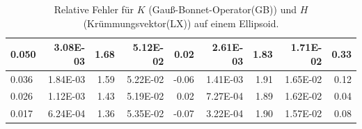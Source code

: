 \begin{table}[htbp]
\begin{tabular}{|l|r|r|r|r|r|r|r|r|}
            0.050 & 3.08E-03 & 1.68 & 5.12E-02 & 0.02 & 2.61E-03 & 1.83 & 1.71E-02 & 0.33 \\ \hline
            0.036 & 1.84E-03 & 1.59 & 5.22E-02 & -0.06 & 1.41E-03 & 1.91 & 1.65E-02 & 0.12 \\ \hline
            0.026 & 1.12E-03 & 1.43 & 5.19E-02 & 0.02 & 7.27E-04 & 1.89 & 1.62E-02 & 0.04 \\ \hline
            0.017 & 6.24E-04 & 1.36 & 5.35E-02 & -0.07 & 3.22E-04 & 1.90 & 1.57E-02 & 0.08 \\ \hline
      \end{tabular}
      \caption[Gauß-Bonnet und Krümmungsvektor auf einem Ellipsoid]{Relative Fehler für \( K \) (Gauß-Bonnet-Operator(GB)) und \( H \)
      (Krümmungsvektor(LX)) auf einem Ellipsoid.}
      \label{tabHeineCGBLX}
   \end{table}
  

